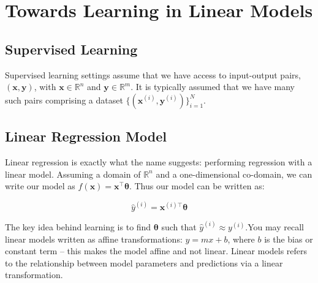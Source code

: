 \chapter{Towards Learning in Linear Models}


\section{Supervised Learning}
Supervised learning settings assume that we have access to input-output pairs, $(\bm{x}, \bm{y})$, with $\bm{x} \in \mathbb{R}^n$ and $\bm{y} \in \mathbb{R}^m$. It is typically assumed that we have many such pairs comprising a dataset $\{(\bm{x}^{(i)}, \bm{y}^{(i)})\}_{i=1}^N$.

\section{Linear Regression Model}
Linear regression is exactly what the name suggests: performing regression with a linear model. Assuming a domain of $\mathbb{R}^n$ and a one-dimensional co-domain, we can write our model as $f(\bm{x}) = \bm{x}^\top \bm{\theta}$. Thus our model can be written as:

\[
\hat{y}^{(i)} = \bm{x}^{(i)\top} \bm{\theta}
\]

The key idea behind learning is to find $\bm{\theta}$ such that $\hat{y}^{(i)} \approx y^{(i)}$.You may recall linear models written as affine transformations: $y = mx + b$, where $b$ is the bias or constant term – this makes the model affine and not linear. Linear models refers to the relationship between model parameters and predictions via a linear transformation.



